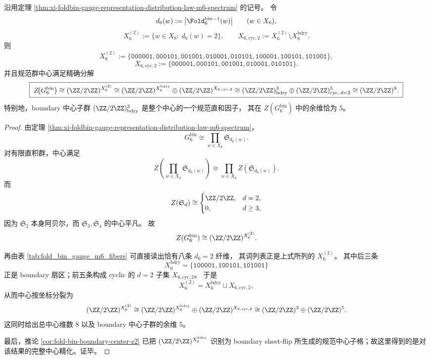 \begin{theorem}\label{thm:xi-window6-center-exact-splitting-bdry-cyclic}
沿用定理 \ref{thm:xi-foldbin-gauge-representation-distribution-law-m6-spectrum} 的记号。
令
\[
d_6(w):=\bigl|\Fold_6^{\mathrm{bin}}{}^{-1}(w)\bigr|
\qquad(w\in X_6),
\]
\[
X_6^{(2)}:=\{w\in X_6:\ d_6(w)=2\},
\qquad
X_{6,\mathrm{cyc},2}:=X_6^{(2)}\setminus X_6^{\mathrm{bdry}}.
\]
则
\[
X_6^{(2)}
:=
\{\texttt{000001},\texttt{000101},\texttt{001001},\texttt{010001},\texttt{010101},
\texttt{100001},\texttt{100101},\texttt{101001}\},
\]
\[
X_{6,\mathrm{cyc},2}
:=
\{\texttt{000001},\texttt{000101},\texttt{001001},\texttt{010001},\texttt{010101}\}.
\]
并且规范群中心满足精确分解
\[
\boxed{\;
Z\!\bigl(G_6^{\mathrm{bin}}\bigr)
\cong
(\ZZ/2\ZZ)^{X_6^{(2)}}
\cong
(\ZZ/2\ZZ)^{X_6^{\mathrm{bdry}}}
\oplus
(\ZZ/2\ZZ)^{X_{6,\mathrm{cyc},2}}
\cong
(\ZZ/2\ZZ)^3_{\mathrm{bdry}}
\oplus
(\ZZ/2\ZZ)^5_{\mathrm{cyc},\,d=2}
\cong
(\ZZ/2\ZZ)^8.\;}
\]
特别地，boundary 中心子群 \((\ZZ/2\ZZ)^3_{\mathrm{bdry}}\) 是整个中心的一个规范直和因子，
其在 \(Z(G_6^{\mathrm{bin}})\) 中的余维恰为 \(5\)。
\end{theorem}
\begin{proof}
由定理 \ref{thm:xi-foldbin-gauge-representation-distribution-law-m6-spectrum}，
\[
G_6^{\mathrm{bin}}\cong \prod_{w\in X_6}\mathfrak S_{d_6(w)}.
\]
对有限直积群，中心满足
\[
Z\!\left(\prod_{w\in X_6}\mathfrak S_{d_6(w)}\right)
\cong
\prod_{w\in X_6} Z\!\left(\mathfrak S_{d_6(w)}\right).
\]
而
\[
Z(\mathfrak S_d)\cong
\begin{cases}
\ZZ/2\ZZ,& d=2,\\
0,& d\ge 3,
\end{cases}
\]
因为 \(\mathfrak S_2\) 本身阿贝尔，而 \(\mathfrak S_3,\mathfrak S_4\) 的中心平凡。
故
\[
Z(G_6^{\mathrm{bin}})\cong (\ZZ/2\ZZ)^{X_6^{(2)}}.
\]
\par
再由表 \ref{tab:fold_bin_gauge_m6_fibers} 可直接读出恰有八条 \(d_6=2\) 纤维，
其词列表正是上式所列的 \(X_6^{(2)}\)。
其中后三条
\[
X_6^{\mathrm{bdry}}=\{\texttt{100001},\texttt{100101},\texttt{101001}\}
\]
正是 boundary 扇区；前五条构成 cyclic 的 \(d=2\) 子集 \(X_{6,\mathrm{cyc},2}\)。
于是
\[
X_6^{(2)}=X_6^{\mathrm{bdry}}\sqcup X_{6,\mathrm{cyc},2},
\]
从而中心按坐标分裂为
\[
(\ZZ/2\ZZ)^{X_6^{(2)}}
\cong
(\ZZ/2\ZZ)^{X_6^{\mathrm{bdry}}}
\oplus
(\ZZ/2\ZZ)^{X_{6,\mathrm{cyc},2}}
\cong
(\ZZ/2\ZZ)^3\oplus (\ZZ/2\ZZ)^5.
\]
这同时给出总中心维数 \(8\) 以及 boundary 中心子群的余维 \(5\)。
\par
最后，推论 \ref{cor:fold-bin-boundary-center-z2} 已把
\((\ZZ/2\ZZ)^{X_6^{\mathrm{bdry}}}\)
识别为 boundary sheet-flip 所生成的规范中心子格；故这里得到的是对该结果的完整中心精化。证毕。
\end{proof}
